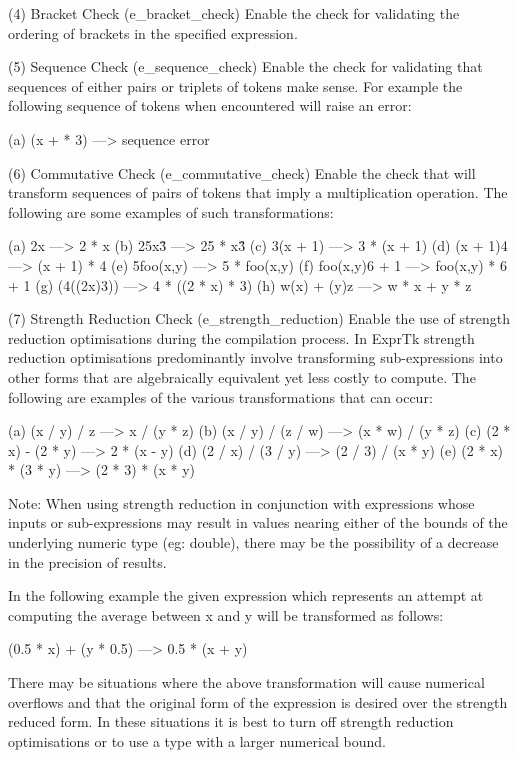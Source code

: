 (4) Bracket Check (e\_bracket\_check)
Enable  the  check for  validating  the ordering  of  brackets in  the
specified expression.


(5) Sequence Check (e\_sequence\_check)
Enable the  check for  validating that  sequences of  either pairs  or
triplets of tokens make sense.  For example the following sequence  of
tokens when encountered will raise an error:

(a) (x + * 3)  --->  sequence error


(6) Commutative Check (e\_commutative\_check)
Enable the check that will transform sequences of pairs of tokens that
imply a multiplication operation.  The following are some  examples of
such transformations:

(a) 2x             --->  2 * x
(b) 25x\^3          --->  25 * x\^3
(c) 3(x + 1)       --->  3 * (x + 1)
(d) (x + 1)4       --->  (x + 1) * 4
(e) 5foo(x,y)      --->  5 * foo(x,y)
(f) foo(x,y)6 + 1  --->  foo(x,y) * 6 + 1
(g) (4((2x)3))     --->  4 * ((2 * x) * 3)
(h) w(x) + (y)z    --->  w * x + y * z


(7) Strength Reduction Check (e\_strength\_reduction)
Enable  the  use  of  strength  reduction  optimisations  during   the
compilation  process.  In  ExprTk  strength  reduction   optimisations
predominantly involve  transforming sub-expressions  into other  forms
that  are algebraically  equivalent yet  less costly  to compute.  The
following are examples of the various transformations that can occur:

(a) (x / y) / z        --->  x / (y * z)
(b) (x / y) / (z / w)  --->  (x * w) / (y * z)
(c) (2 * x) - (2 * y)  --->  2 * (x - y)
(d) (2 / x) / (3 / y)  --->  (2 / 3) / (x * y)
(e) (2 * x) * (3 * y)  --->  (2 * 3) * (x * y)


Note:
When using  strength reduction  in conjunction  with expressions whose
inputs or sub-expressions may result  in values nearing either of  the
bounds of the underlying numeric  type (eg: double), there may  be the
possibility of a decrease in the precision of results.

In  the following  example the  given expression  which represents  an
attempt at computing the average  between x and y will  be transformed
as follows:

(0.5 * x) + (y * 0.5) ---> 0.5 * (x + y)

There  may be  situations where  the above  transformation will  cause
numerical overflows and  that the original  form of the  expression is
desired over the strength reduced form. In these situations it is best
to turn off strength reduction optimisations  or to use a type with  a
larger numerical bound.

